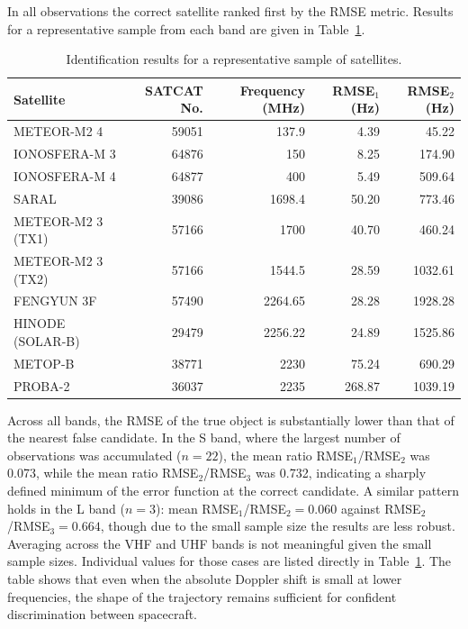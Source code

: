 \documentclass[lineno,pdflatex,sn-basic,referee,]{sn-jnl}
\begin{document}
In all observations the correct satellite ranked first by the RMSE metric. Results for a representative sample from each band are given in Table~\ref{tab:results}.

\begin{table}[!htbp]
    \centering
    \caption{Identification results for a representative sample of satellites.}
    \label{tab:results}
    \begin{tabular}{lrrrr}
        \toprule
        Satellite & SATCAT No. & Frequency (MHz) & RMSE$_1$ (Hz) & RMSE$_2$ (Hz) \\
        \midrule
        METEOR-M2 4         & 59051 & 137.9   &  4.39 &   45.22 \\
        IONOSFERA-M 3       & 64876 & 150     &  8.25 &  174.90 \\
        IONOSFERA-M 4       & 64877 & 400     &  5.49 &  509.64 \\
        SARAL               & 39086 & 1698.4  & 50.20 &  773.46 \\
        METEOR-M2 3 (TX1)   & 57166 & 1700    & 40.70 &  460.24 \\
        METEOR-M2 3 (TX2)   & 57166 & 1544.5  & 28.59 & 1032.61 \\
        FENGYUN 3F          & 57490 & 2264.65 & 28.28 & 1928.28 \\
        HINODE (SOLAR-B)    & 29479 & 2256.22 & 24.89 & 1525.86 \\
        METOP-B             & 38771 & 2230    & 75.24 &  690.29 \\
        PROBA-2             & 36037 & 2235    &268.87 & 1039.19 \\
        \bottomrule
    \end{tabular}
\end{table}

Across all bands, the RMSE of the true object is substantially lower than that of the nearest false candidate. In the S band, where the largest number of observations was accumulated ($n = 22$), the mean ratio RMSE$_1$/RMSE$_2$ was 0.073, while the mean ratio RMSE$_2$/RMSE$_3$ was 0.732, indicating a sharply defined minimum of the error function at the correct candidate. A similar pattern holds in the L band ($n = 3$): mean RMSE$_1$/RMSE$_2 = 0.060$ against RMSE$_2$/RMSE$_3 = 0.664$, though due to the small sample size the results are less robust. Averaging across the VHF and UHF bands is not meaningful given the small sample sizes. Individual values for those cases are listed directly in Table~\ref{tab:results}. The table shows that even when the absolute Doppler shift is small at lower frequencies, the shape of the trajectory remains sufficient for confident discrimination between spacecraft.
\end{document}

